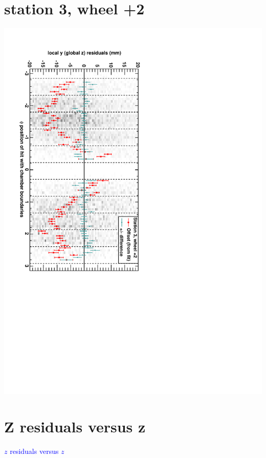 \documentclass[compress]{beamer}
\begin{document}
\section*{station 3, wheel +2}
\begin{frame} \vfill \mbox{\hspace{-1 cm}\includegraphics[height=1.2\linewidth, angle=90]{DTzVsPhi_st3_whE.pdf}} \end{frame}

\section*{Z residuals versus z}
\begin{frame}
\begin{center}
\Huge \textcolor{blue}{$z$ residuals versus $z$}
\end{center}
\end{frame}
\end{document}
